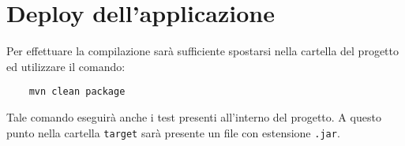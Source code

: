 \section{Deploy dell'applicazione}
Per effettuare la compilazione sarà sufficiente spostarsi nella cartella del progetto ed utilizzare il comando:
\begin{lstlisting}
    mvn clean package
\end{lstlisting}
Tale comando eseguirà anche i test presenti all'interno del progetto.
A questo punto nella cartella \texttt{target} sarà presente un file con estensione \texttt{.jar}.